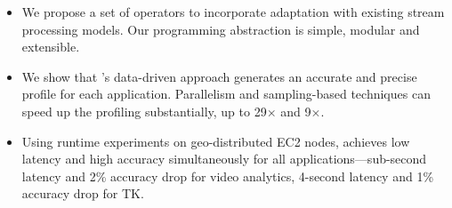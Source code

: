 \begin{itemize}[leftmargin=*, topsep=4pt]

\item We propose a set of \maybe{} operators to incorporate adaptation with
  existing stream processing models. Our programming abstraction is simple,
  modular and extensible.

\item We show that \sysname{}'s data-driven approach generates an accurate and
  precise profile for each application. Parallelism and sampling-based techniques
  can speed up the profiling substantially, up to 29$\times$ and 9$\times$\@.

\item Using runtime experiments on geo-distributed EC2 nodes, \sysname{}
  achieves low latency and high accuracy simultaneously for all applications---sub-second latency and 2\% accuracy drop for video analytics, 4-second latency
  and 1\% accuracy drop for TK\@.

\end{itemize}


